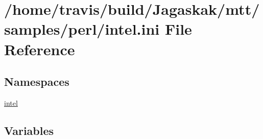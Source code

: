 \hypertarget{intel_8ini}{\section{/home/travis/build/\-Jagaskak/mtt/samples/perl/intel.ini File Reference}
\label{intel_8ini}
}
\subsection*{Namespaces}
\begin{DoxyCompactItemize}
\item 
\hyperlink{namespaceintel}{intel}
\end{DoxyCompactItemize}
\subsection*{Variables}
